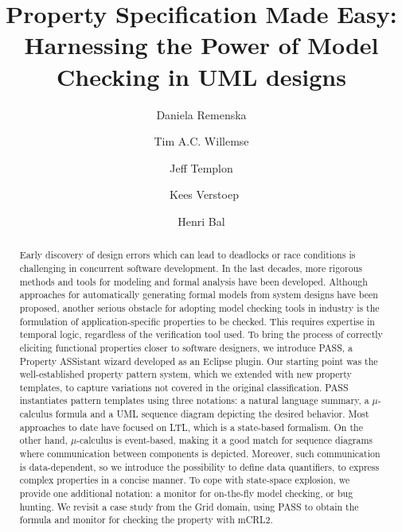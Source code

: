 \documentclass[letter]{llncs}
\begin{document}
\title{Property Specification Made Easy: Harnessing the Power of Model Checking in UML designs}

\author{Daniela Remenska
\and Tim A.C. Willemse \and Jeff Templon \and\
Kees Verstoep \and Henri Bal}
%


\maketitle

\begin{abstract}
Early discovery of design errors which can lead to deadlocks or race conditions is 
challenging in concurrent software development. 
In the last decades, more rigorous
methods and tools for modeling and formal analysis have been developed. 
Although approaches for automatically generating formal models from system designs have 
been proposed, another serious obstacle for adopting model checking tools in industry
is the formulation of application-specific properties to be checked. 
This requires expertise in temporal logic, regardless of the verification tool used.
To bring the process of correctly eliciting functional properties closer to software 
designers, we introduce PASS, a Property ASSistant wizard developed 
as an Eclipse plugin. Our starting point was the well-established property pattern system,
which we extended with new property templates, to capture variations not covered 
in the original classification. PASS instantiates pattern templates using three notations: a natural language summary, a $\mu$-calculus formula
and a UML sequence diagram depicting the desired behavior. Most approaches to date 
have focused on LTL, which is a state-based formalism. On the other hand,
 $\mu$-calculus is event-based, making it a good match for sequence diagrams where communication between
 components is depicted. 
Moreover, such communication is data-dependent, so we introduce
the possibility to define data quantifiers, to express complex properties in a concise manner.
To cope with state-space explosion, we provide one additional notation: a monitor for on-the-fly model checking, or bug hunting.
We revisit a case study from the Grid domain, using PASS to obtain the
formula and monitor for checking the property with mCRL2.
\end{abstract}
\end{document}
